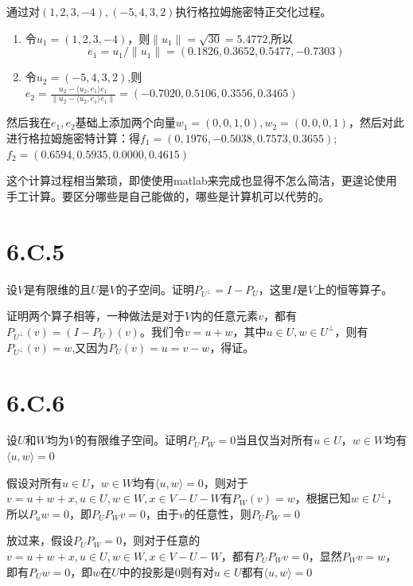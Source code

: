 \documentclass[10pt,a4paper,UTF8]{article}
\begin{document}
\begin{tikzanswer}
通过对\((1,2,3,-4),(-5,4,3,2)\)执行格拉姆施密特正交化过程。
\begin{enumerate}
\item 令\(u_{1} = (1,2,3,-4)\)，则\(\| u_{1} \| = \sqrt{30} = 5.4772\),所以\[e_{1} = u_{1}/ \| u_{1} \|= (0.1826,0.3652,0.5477,-0.7303)   \]
\item 令\(u_{2} = (-5,4,3,2)\),则\(e_{2} = \frac{u_{2} - \langle u_{2},e_{1} \rangle e_{1}  }{ \| u_{2} - \langle u_{2},e_{1} \rangle e_{1}  \| } = (-0.7020, 0.5106,0.3556,0.3465)\)
\end{enumerate}
然后我在\(e_{1},e_{2}\)基础上添加两个向量\(w_{1} = (0,0,1,0),w_{2} = (0,0,0,1)\)，然后对此进行格拉姆施密特计算：得\(f_{1} = (0,1976,-0.5038,0.7573,0.3655)\); \(f_{2} = (0.6594,0.5935,0.0000,0.4615)\)

这个计算过程相当繁琐，即使使用matlab来完成也显得不怎么简洁，更遑论使用手工计算。要区分哪些是自己能做的，哪些是计算机可以代劳的。
\end{tikzanswer}
\section{6.C.5}
\label{sec:orge0f89d4}


\begin{tikzproblem}
设\(V\)是有限维的且\(U\)是\(V\)的子空间。证明\(P_{U^{\bot}} = I - P_{U}\)，这里\(I\)是\(V\)上的恒等算子。
\end{tikzproblem}
\begin{tikzanswer}
证明两个算子相等，一种做法是对于\(V\)内的任意元素\(v\)，都有\(P_{U^{\bot}}(v) = (I - P_{U})(v)\)。我们令\(v = u + w\)，其中\(u\in U,w\in U^{\bot}\)，则有\(P_{U^{\bot}}(v) = w\),又因为\(P_{U}(v) = u=v-w\)，得证。
\end{tikzanswer}
\section{6.C.6}
\label{sec:orga4d49d3}


\begin{tikzproblem}
设\(U\)和\(W\)均为\(V\)的有限维子空间。证明\(P_{U}P_{W} = 0\)当且仅当对所有\(u\in U\)，\(w\in W\)均有\(\langle u,w \rangle = 0\)
\end{tikzproblem}
\begin{tikzanswer}
假设对所有\(u\in U\)，\(w\in W\)均有\(\langle u,w \rangle = 0\)，则对于\(v=u+w+x,u\in U,w\in W,x\in V-U-W\)有\(P_{W}(v) = w\)，根据已知\(w\in U^{\bot}\)，所以\(P_{u}w = 0\)，即\(P_{U}P_{W}v = 0\)，由于\(v\)的任意性，则\(P_{U}P_{W} = 0\)

放过来，假设\(P_{U}P_{W} = 0\)，则对于任意的\(v = u+w+x,u\in U,w\in W,x\in V-U-W\)，都有\(P_{U}P_{W}v = 0\)，显然\(P_{W}v = w\)，即有\(P_{U}w = 0\)，即\(w\)在\(U\)中的投影是\(0\)则有对\(u\in U\)都有\(\langle u,w \rangle   = 0\)
\end{tikzanswer}
\end{document}
